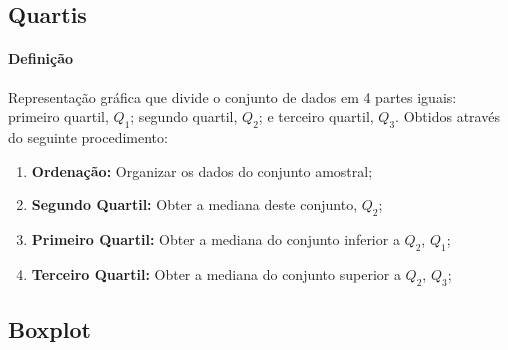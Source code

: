 \documentclass{article}
\begin{document}
        \subsection{Quartis}
            \paragraph{Definição}Representação gráfica que divide o conjunto de dados em 4 partes iguais: primeiro quartil, $Q_{1}$; segundo quartil, $Q_{2}$; e terceiro quartil, $Q_{3}$. Obtidos através do seguinte procedimento:
                \begin{enumerate}[noitemsep]
                    \item \textbf{Ordenação:} Organizar os dados do conjunto amostral;
                    \item \textbf{Segundo Quartil:} Obter a mediana deste conjunto, $Q_{2}$;
                    \item \textbf{Primeiro Quartil:} Obter a mediana do conjunto inferior a $Q_{2}$, $Q_{1}$;
                    \item \textbf{Terceiro Quartil:} Obter a mediana do conjunto superior a $Q_{2}$, $Q_{3}$;
                \end{enumerate}

        \subsection{Boxplot}
\end{document}
